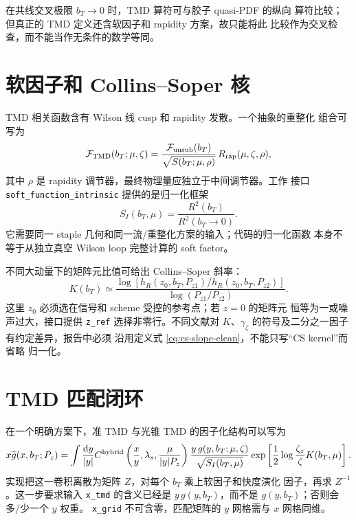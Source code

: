 \documentclass[UTF8,11pt,oneside]{ctexbook}
\newcommand{\dd}{\mathrm{d}}
\begin{document}
在共线交叉极限 \(b_T\to0\) 时，TMD 算符可与胶子 quasi-PDF 的纵向
算符比较；但真正的 TMD 定义还含软因子和 rapidity 方案，故只能将此
比较作为交叉检查，而不能当作无条件的数学等同。

\section{软因子和 Collins--Soper 核}
TMD 相关函数含有 Wilson 线 cusp 和 rapidity 发散。一个抽象的重整化
组合可写为
\begin{equation}
 \mathcal F_{\rm TMD}(b_T;\mu,\zeta)
 =\frac{\mathcal F_{\rm unsub}(b_T)}
 {\sqrt{S(b_T;\mu,\rho)}}\,R_{\rm rap}(\mu,\zeta,\rho),
 \label{eq:tmd-soft-rapidity-clean}
\end{equation}
其中 \(\rho\) 是 rapidity 调节器，最终物理量应独立于中间调节器。工作
接口 \texttt{soft\_function\_intrinsic} 提供的是归一化框架
\begin{equation}
 S_I(b_T,\mu)=\frac{R^2(b_T)}{R^2(b_T\to0)}.
 \label{eq:intrinsic-soft-clean}
\end{equation}
它需要同一 staple 几何和同一流/重整化方案的输入；代码的归一化函数
本身不等于从独立真空 Wilson loop 完整计算的 soft factor。

不同大动量下的矩阵元比值可给出 Collins--Soper 斜率：
\begin{equation}
 K(b_T)\simeq
 \frac{\log[h_R(z_0,b_T,P_{z1})/
 h_R(z_0,b_T,P_{z2})]}
 {\log(P_{z1}/P_{z2})}.
 \label{eq:cs-slope-clean}
\end{equation}
这里 \(z_0\) 必须选在信号和 scheme 受控的参考点；若 \(z=0\) 的矩阵元
恒等为一或噪声过大，接口提供 \texttt{z\_ref} 选择非零行。不同文献对
\(K\)、\(\gamma_\zeta\) 的符号及二分之一因子有约定差异，报告中必须
沿用定义式 \eqref{eq:cs-slope-clean}，不能只写“CS kernel”而省略
归一化。

\section{TMD 匹配闭环}
在一个明确方案下，准 TMD 与光锥 TMD 的因子化结构可以写为
\begin{equation}
 x\widetilde g(x,b_T;P_z)
 =\int\frac{\dd y}{|y|}
 C^{\rm hybrid}\left(\frac{x}{y},
 \lambda_s,\frac{\mu}{|y|P_z}\right)
 \frac{y\,g(y,b_T;\mu,\zeta)}{\sqrt{S_I(b_T,\mu)}}
 \exp\left[\frac12\log\frac{\zeta_z}{\zeta}K(b_T,\mu)\right].
 \label{eq:tmd-matching-clean}
\end{equation}
实现把这一卷积离散为矩阵 \(Z\)，对每个 \(b_T\) 乘上软因子和快度演化
因子，再求 \(Z^{-1}\)。这一步要求输入 \texttt{x\_tmd} 的含义已经是
\(y\,g(y,b_T)\)，而不是 \(g(y,b_T)\)；否则会多/少一个 \(y\) 权重。
\texttt{x\_grid} 不可含零，匹配矩阵的 \(y\) 网格需与 \(x\) 网格同维。
\end{document}
